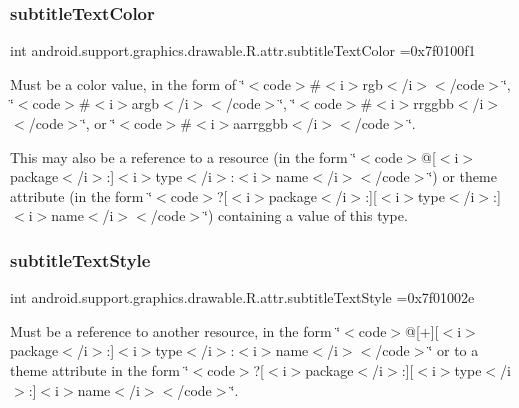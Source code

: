 \subsubsection{\texorpdfstring{subtitle\+Text\+Color}{subtitleTextColor}}
{\footnotesize\ttfamily int android.\+support.\+graphics.\+drawable.\+R.\+attr.\+subtitle\+Text\+Color =0x7f0100f1\hspace{0.3cm}{\ttfamily [static]}}

Must be a color value, in the form of \char`\"{}$<$code$>$\#$<$i$>$rgb$<$/i$>$$<$/code$>$\char`\"{}, \char`\"{}$<$code$>$\#$<$i$>$argb$<$/i$>$$<$/code$>$\char`\"{}, \char`\"{}$<$code$>$\#$<$i$>$rrggbb$<$/i$>$$<$/code$>$\char`\"{}, or \char`\"{}$<$code$>$\#$<$i$>$aarrggbb$<$/i$>$$<$/code$>$\char`\"{}. 

This may also be a reference to a resource (in the form \char`\"{}$<$code$>$@\mbox{[}$<$i$>$package$<$/i$>$\+:\mbox{]}$<$i$>$type$<$/i$>$\+:$<$i$>$name$<$/i$>$$<$/code$>$\char`\"{}) or theme attribute (in the form \char`\"{}$<$code$>$?\mbox{[}$<$i$>$package$<$/i$>$\+:\mbox{]}\mbox{[}$<$i$>$type$<$/i$>$\+:\mbox{]}$<$i$>$name$<$/i$>$$<$/code$>$\char`\"{}) containing a value of this type. \mbox{\label{classandroid_1_1support_1_1graphics_1_1drawable_1_1R_1_1attr_af4b58eb0ee183d623b2f935f503dee78}} 
\subsubsection{\texorpdfstring{subtitle\+Text\+Style}{subtitleTextStyle}}
{\footnotesize\ttfamily int android.\+support.\+graphics.\+drawable.\+R.\+attr.\+subtitle\+Text\+Style =0x7f01002e\hspace{0.3cm}{\ttfamily [static]}}

Must be a reference to another resource, in the form \char`\"{}$<$code$>$@\mbox{[}+\mbox{]}\mbox{[}$<$i$>$package$<$/i$>$\+:\mbox{]}$<$i$>$type$<$/i$>$\+:$<$i$>$name$<$/i$>$$<$/code$>$\char`\"{} or to a theme attribute in the form \char`\"{}$<$code$>$?\mbox{[}$<$i$>$package$<$/i$>$\+:\mbox{]}\mbox{[}$<$i$>$type$<$/i$>$\+:\mbox{]}$<$i$>$name$<$/i$>$$<$/code$>$\char`\"{}. \mbox{\label{classandroid_1_1support_1_1graphics_1_1drawable_1_1R_1_1attr_ae391b692f18e18a6593bf6019c07ee59}} 
